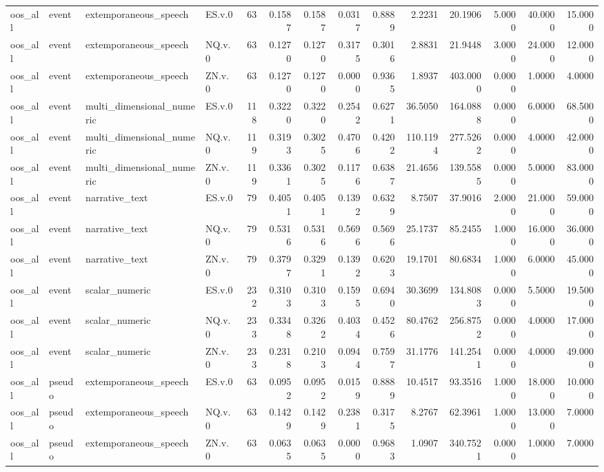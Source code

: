 \begin{tabular}{llllrrrrrrrrrr}
oos_all & event & extemporaneous_speech & ES.v.0 & 63 & 0.1587 & 0.1587 & 0.0317 & 0.8889 & 2.2231 & 20.1906 & 5.0000 & 40.0000 & 15.0000 \\
oos_all & event & extemporaneous_speech & NQ.v.0 & 63 & 0.1270 & 0.1270 & 0.3175 & 0.3016 & 2.8831 & 21.9448 & 3.0000 & 24.0000 & 12.0000 \\
oos_all & event & extemporaneous_speech & ZN.v.0 & 63 & 0.1270 & 0.1270 & 0.0000 & 0.9365 & 1.8937 & 403.0000 & 0.0000 & 1.0000 & 4.0000 \\
oos_all & event & multi_dimensional_numeric & ES.v.0 & 118 & 0.3220 & 0.3220 & 0.2542 & 0.6271 & 36.5050 & 164.0888 & 0.0000 & 6.0000 & 68.5000 \\
oos_all & event & multi_dimensional_numeric & NQ.v.0 & 119 & 0.3193 & 0.3025 & 0.4706 & 0.4202 & 110.1194 & 277.5262 & 0.0000 & 4.0000 & 42.0000 \\
oos_all & event & multi_dimensional_numeric & ZN.v.0 & 119 & 0.3361 & 0.3025 & 0.1176 & 0.6387 & 21.4656 & 139.5585 & 0.0000 & 5.0000 & 83.0000 \\
oos_all & event & narrative_text & ES.v.0 & 79 & 0.4051 & 0.4051 & 0.1392 & 0.6329 & 8.7507 & 37.9016 & 2.0000 & 21.0000 & 59.0000 \\
oos_all & event & narrative_text & NQ.v.0 & 79 & 0.5316 & 0.5316 & 0.5696 & 0.5696 & 25.1737 & 85.2455 & 1.0000 & 16.0000 & 36.0000 \\
oos_all & event & narrative_text & ZN.v.0 & 79 & 0.3797 & 0.3291 & 0.1392 & 0.6203 & 19.1701 & 80.6834 & 1.0000 & 6.0000 & 45.0000 \\
oos_all & event & scalar_numeric & ES.v.0 & 232 & 0.3103 & 0.3103 & 0.1595 & 0.6940 & 30.3699 & 134.8083 & 0.0000 & 5.5000 & 19.5000 \\
oos_all & event & scalar_numeric & NQ.v.0 & 233 & 0.3348 & 0.3262 & 0.4034 & 0.4526 & 80.4762 & 256.8752 & 0.0000 & 4.0000 & 17.0000 \\
oos_all & event & scalar_numeric & ZN.v.0 & 233 & 0.2318 & 0.2103 & 0.0944 & 0.7597 & 31.1776 & 141.2541 & 0.0000 & 4.0000 & 49.0000 \\
oos_all & pseudo & extemporaneous_speech & ES.v.0 & 63 & 0.0952 & 0.0952 & 0.0159 & 0.8889 & 10.4517 & 93.3516 & 1.0000 & 18.0000 & 10.0000 \\
oos_all & pseudo & extemporaneous_speech & NQ.v.0 & 63 & 0.1429 & 0.1429 & 0.2381 & 0.3175 & 8.2767 & 62.3961 & 1.0000 & 13.0000 & 7.0000 \\
oos_all & pseudo & extemporaneous_speech & ZN.v.0 & 63 & 0.0635 & 0.0635 & 0.0000 & 0.9683 & 1.0907 & 340.7521 & 0.0000 & 1.0000 & 7.0000 \\

\end{tabular}
